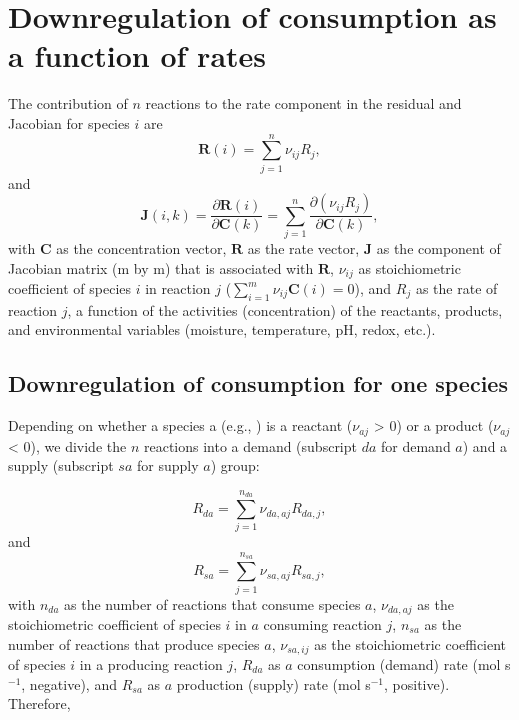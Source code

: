 \documentclass[gmd, manuscript]{copernicus}
\begin{document}
\section{Downregulation of consumption as a function of rates}    %
The contribution of $n$ reactions to the rate component in the residual and
Jacobian for species $i$ are
\begin{equation}
\mathbf{R}(i)=\sum_{j=1}^n \nu_{ij} R_j,
\end{equation}
and
\begin{equation}
\mathbf{J}(i,k)=\frac{\partial \mathbf{R}(i)}{\partial \mathbf{C}(k)} =
\sum_{j=1}^n \frac{\partial (\nu_{ij} R_j)}{\partial \mathbf{C}(k)},
\end{equation}
with $\mathbf{C}$ as the concentration vector, $\mathbf{R}$ as the rate vector,
$\mathbf{J}$ as the component of Jacobian matrix (m by m) that is associated
with $\mathbf{R}$, $\nu_{ij}$ as stoichiometric coefficient of species $i$ in
reaction $j$ ($\sum_{i=1}^m \nu_{ij} \mathbf{C}(i) = 0$), and $R_j$ as the rate of
reaction $j$, a function of the activities (concentration) of the reactants,
products, and environmental variables (moisture, temperature, pH, redox, etc.).

\subsection{Downregulation of consumption for one species}
Depending on whether a species a (e.g., ) is a reactant
($\nu_{aj}$ > 0) or a product ($\nu_{aj}$ < 0), we divide the $n$ reactions into a
demand (subscript $da$ for demand $a$) and a supply (subscript $sa$ for supply
$a$) group:

\begin{equation}
R_{da}=\sum_{j=1}^{n_{da}} \nu_{da,aj} R_{da,j},
\end{equation}
and
\begin{equation}
R_{sa}=\sum_{j=1}^{n_{sa}} \nu_{sa,aj} R_{sa,j},
\end{equation}
with $n_{da}$ as the number of reactions that consume species $a$,
$\nu_{da,aj}$ as the stoichiometric coefficient of species $i$ in $a$ consuming
reaction $j$, $n_{sa}$ as the number of reactions that produce species $a$,
$\nu_{sa,ij}$ as the stoichiometric coefficient of species $i$ in a producing
reaction $j$, $R_{da}$ as $a$ consumption (demand) rate (mol s$^{-1}$,
negative), and $R_{sa}$ as $a$ production (supply) rate (mol s$^{-1}$,
positive). Therefore, 
\end{document}
